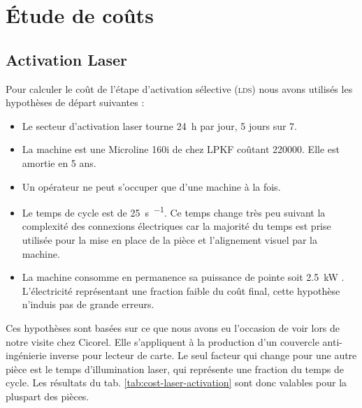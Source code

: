 \section{Étude de coûts}

\subsection{Activation Laser}
Pour calculer le coût de l'étape d'activation sélective (\textsc{lds}) nous avons utilisés les hypothèses de départ suivantes :
\begin{itemize}
    \item Le secteur d'activation laser tourne \SI{24}{\hour} par jour, 5 jours sur 7.
    \item La machine est une Microline 160i de chez LPKF coûtant \SI{220000}{\chf}.
        Elle est amortie en 5 ans.
    \item Un opérateur ne peut s'occuper que d'une machine à la fois.
    \item Le temps de cycle est de \SI{25}{\second\per\piece}.
        Ce temps change très peu suivant la complexité des connexions électriques car la majorité du temps est prise utilisée pour la mise en place de la pièce et l'alignement visuel par la machine.
    \item La machine consomme en permanence sa puissance de pointe soit \SI{2.5}{\kilo\watt} \cite{lpkf-microline-series}.
        L'électricité représentant une fraction faible du coût final, cette hypothèse n'induis pas de grande erreurs.
\end{itemize}

Ces hypothèses sont basées sur ce que nous avons eu l'occasion de voir lors de notre visite chez Cicorel.
Elle s'appliquent à la production d'un couvercle anti-ingénierie inverse pour lecteur de carte.
Le seul facteur qui change pour une autre pièce est le temps d'illumination laser, qui représente une fraction du temps de cycle.
Les résultats du tab. \ref{tab:cost-laser-activation} sont donc valables pour la pluspart des pièces.


